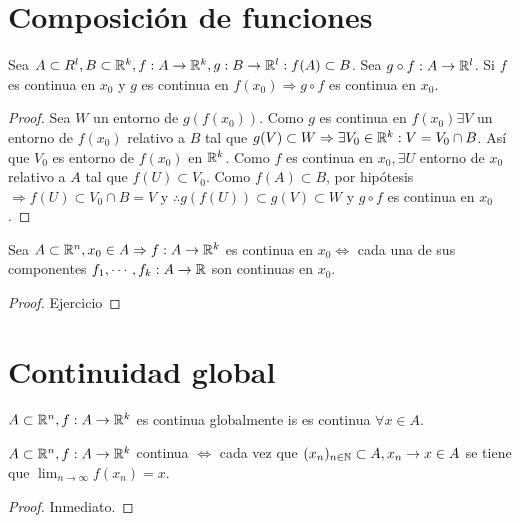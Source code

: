 \section{Composición de funciones}

\begin{theorem}
  Sea $A \subset R^l, B \subset \mathbb{R}^k, f: A \to \mathbb{R}^k, g: B \to \mathbb{R}^l : f(A) \subset B$. Sea $g \circ f: A \to \mathbb{R}^l$. Si $f$ es continua en $x_0$ y $g$ es continua en $f(x_0) \Rightarrow g \circ f$ es continua en $x_0$.
  \begin{proof}
    Sea $W$ un entorno de $g(f(x_0))$. Como $g$ es continua en $f(x_0) \exists V$ un entorno de $f(x_0)$ relativo a $B$ tal que $g(V) \subset W \Rightarrow \exists V_0 \in \mathbb{R}^k : V = V_0 \cap B$. Así que $V_0$ es entorno de $f(x_0)$ en $\mathbb{R}^k$. Como $f$ es continua en $x_0, \exists U$ entorno de $x_0$ relativo a $A$ tal que $f(U) \subset V_0$. Como $f(A) \subset B$, por hipótesis $\Rightarrow f(U) \subset V_0 \cap B = V$ y $\therefore g(f(U)) \subset g(V) \subset W$ y $g \circ f$ es continua en $x_0$. 
  \end{proof}
\end{theorem}

\begin{prop}
  Sea $A \subset \mathbb{R}^n, x_0 \in A \Rightarrow f: A \to \mathbb{R}^k$ es continua en $x_0 \iff$ cada una de sus componentes $f_1, \cdots, f_k: A \to \mathbb{R}$ son continuas en $x_0$.
  \begin{proof}
    Ejercicio
  \end{proof}
\end{prop}

\section{Continuidad global}

\begin{definition}
  $A \subset \mathbb{R}^n, f: A \to \mathbb{R}^k$ es continua globalmente is es continua $\forall x \in A$.
\end{definition}

\begin{prop}
  $A \subset \mathbb{R}^n, f: A \to \mathbb{R}^k$ continua $\iff$ cada vez que $(x_n)_{n \in \mathbb{N}} \subset A, x_n \to x \in A$ se tiene que $\lim_{n \to \infty} f(x_n) = x$.
  \begin{proof}
    Inmediato.
  \end{proof}
\end{prop}

